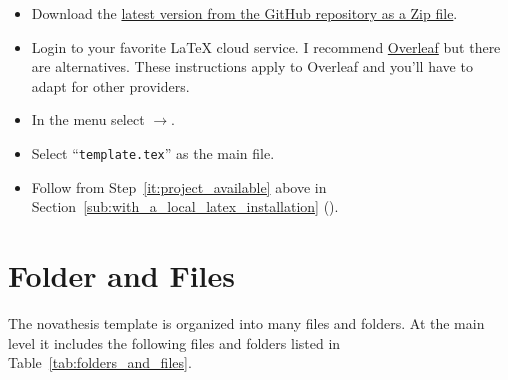 \begin{itemize}
  \item Download the \href{https://github.com/joaomlourenco/novathesis/archive/master.zip}{latest version from the GitHub repository as a Zip file}.
  \item Login to your favorite LaTeX cloud service. I recommend \href{https://www.overleaf.com/?r=f5160636&rm=d&rs=b}{Overleaf} but there are alternatives. These instructions apply to Overleaf and you'll have to adapt for other providers.
  \item In the menu select $\rightarrow$.
  \item Select “\verb!template.tex!” as the main file.
  \item Follow from Step~\ref{it:project_available} above in Section~\ref{sub:with_a_local_latex_installation} ().
\end{itemize}



\section{Folder and Files}
\label{sec:folders_and_files}

The \gls{novathesis} template is organized into many files and folders. At the main level it includes the following files and folders listed in Table~\ref{tab:folders_and_files}.

\newcommand{\accessAllowed}{\texttt{[image: access\_allowed]}}
\newcommand{\accessForbiden}{\texttt{[image: access\_forbidden]}}


